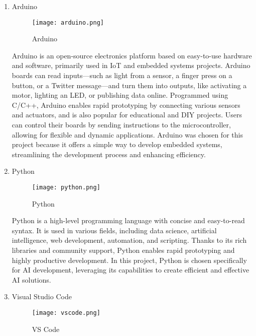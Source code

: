 \documentclass[conference]{IEEEtran}
\begin{document}
\begin{enumerate}[itemsep=2ex, parsep=1ex]
	\item Arduino
	      	      	      
	      \begin{figure}[h!]
	      	\centering
	      	\texttt{[image: arduino.png]}
	      	\caption{Arduino}
	      	\label{fig:Arduino}
	      \end{figure}
	      	      	      
	      Arduino is an open-source electronics platform based on easy-to-use
	      hardware and software, primarily used in IoT and embedded systems projects.
	      Arduino boards can read inputs—such as light from a sensor, a finger press
	      on a button, or a Twitter message—and turn them into outputs, like activating
	      a motor, lighting an LED, or publishing data online. Programmed using C/C++,
	      Arduino enables rapid prototyping by connecting various sensors and actuators,
	      and is also popular for educational and DIY projects. Users can control their
	      boards by sending instructions to the microcontroller, allowing for
	      flexible and dynamic applications. Arduino was chosen for this project because
	      it offers a simple way to develop embedded systems, streamlining the
	      development process and enhancing efficiency.
	      	      	      
	\item Python
	      	      	      
	      \begin{figure}[h!]
	      	\centering
	      	\texttt{[image: python.png]}
	      	\caption{Python}
	      	\label{fig:Python}
	      \end{figure}
	      	      	      
	      Python is a high-level programming language with concise and easy-to-read
	      syntax. It is used in various fields, including data science, artificial intelligence,
	      web development, automation, and scripting. Thanks to its rich libraries and
	      community support, Python enables rapid prototyping and highly productive
	      development. In this project, Python is chosen specifically for AI
	      development, leveraging its capabilities to create efficient and effective
	      AI solutions.
	      	      	      
	\item Visual Studio Code
	      	      	      
	      \begin{figure}[h!]
	      	\centering
	      	\texttt{[image: vscode.png]}
	      	\caption{VS Code}
	      	\label{fig:VSCode}
	      \end{figure}
	      	      	      

\end{enumerate}
\end{document}
